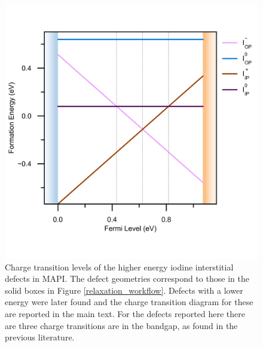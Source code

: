 

\begin{figure}[h!] 
\centering
  \includegraphics[width=0.7\columnwidth]{figures/ap7/charge_transition_HSE_meta.png}
  \caption[Charge transition levels of $\mathrm{I}_\mathrm{i}$]{Charge transition levels of the higher energy iodine interstitial defects in MAPI. The defect geometries correspond to those in the solid boxes in Figure \ref{relaxation_workflow}. Defects with a lower energy were later found and the charge transition diagram for these are reported in the main text. For the defects reported here there are three charge transitions are in the bandgap, as found in the previous literature.\autocite{Du2015,Meggiolaro2018}}
\label{charge_transition_meta}
\end{figure}
